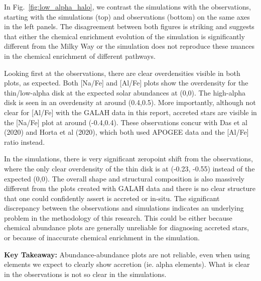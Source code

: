 \documentclass[fleqn,usenatbib]{mnras}
\begin{document}
In Fig.~\ref{fig:low_alpha_halo}, we contrast the simulations with the observations, starting with the simulations (top) and observations (bottom) on the same axes in the left panels. The disagreement between both figures is striking and suggests that either the chemical enrichment evolution of the simulation is significantly different from the Milky Way or the simulation does not reproduce these nuances in the chemical enrichment of different pathways.


 Looking first at the observations, there are clear overdensities visible in both plots, as expected. Both [Na/Fe] and [Al/Fe] plots show the overdensity for the thin/low-alpha disk at the expected solar abundances at (0,0). The high-alpha disk is seen in an overdensity at around (0.4,0.5). More importantly, although not clear for [Al/Fe] with the GALAH data in this report, accreted stars are visible in the [Na/Fe] plot at around (-0.4,0.4). These observations concur with Das et al (2020) and Horta et al (2020), which both used APOGEE data and the [Al/Fe] ratio instead. \par 
In the simulations, there is very significant zeropoint shift from the observations, where the only clear overdensity of the thin disk is at (-0.23, -0.55) instead of the expected (0,0). The overall shape and structural composition is also massively different from the plots created with GALAH data and there is no clear structure that one could confidently assert is accreted or in-situ. The significant discrepancy between the observations and simulations indicates an underlying problem in the methodology of this research. This could be either because chemical abundance plots are generally unreliable for diagnosing accreted stars, or because of inaccurate chemical enrichment in the simulation. \par 
\textbf{Key Takeaway:} Abundance-abundance plots are not reliable, even when using elements we expect to clearly show accretion (ie. alpha elements). What is clear in the observations is not so clear in the simulations.
\end{document}

